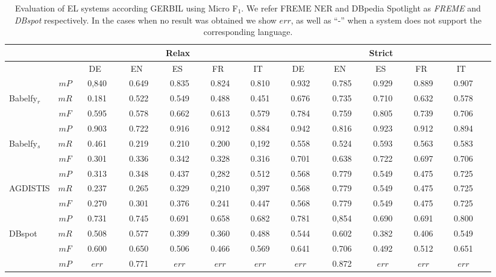 \documentclass{llncs}
\begin{document}
\begin{table}[tb!]
\centering
\caption{Evaluation of EL systems according GERBIL using Micro F$_1$. We refer FREME NER and DBpedia Spotlight as \textit{FREME} and \textit{DBspot} respectively. In the cases when no result was obtained we show $err$, as well as ``-'' when a system does not support the corresponding language.}
\label{tab:gerbil}
\begin{tabular}{@{}lcccccccccccc@{}}
\toprule
            && \multicolumn{5}{c}{Relax}   & \multicolumn{5}{c}{Strict}  \\ \midrule
            &&~~DE~~~&~~EN~~~&~~ES~~~&~~FR~~~&~~IT~~~&~~DE~~~&~~EN~~~&~~ES~~~&~~FR~~~&~~IT~~~\\
            \cmidrule(lr){3-7}\cmidrule(lr){8-12}
            &$mP$& 0,840& 0.649 & 0.835 & 0.824 & 0.810 & 0.932 & 0.785 & 0.929 & 0.889 & 0.907 \\
Babelfy$_r$ &$mR$& 0.181& 0.522 & 0.549 & 0.488 & 0.451 & 0.676 & 0.735 & 0.710 & 0.632 & 0.578 \\
            &$mF$& 0.595& 0.578 & 0.662 & 0.613 & 0.579 & 0.784 & 0.759 & 0.805 & 0.739 & 0.706 \\\midrule
            &$mP$& 0.903& 0.722 & 0.916 & 0.912 & 0.884 & 0.942 & 0.816 & 0.923 & 0.912 & 0.894 \\
Babelfy$_s$ &$mR$& 0.461& 0.219 & 0.210 & 0.200 & 0,192 & 0.558 & 0.524 & 0.593 & 0.563 & 0.583 \\
            &$mF$& 0.301& 0.336 & 0.342 & 0.328 & 0.316 & 0.701 & 0.638 & 0.722 & 0.697 & 0.706 \\\midrule
            &$mP$& 0.313& 0.348 & 0.437 & 0,282 & 0.512 & 0.568 & 0.779 & 0.549 & 0.475 & 0.725 \\
AGDISTIS    &$mR$& 0.237& 0.265 & 0.329 & 0,210 & 0,397 & 0.568 & 0.779 & 0.549 & 0.475 & 0.725 \\
            &$mF$& 0.270& 0.301 & 0.376 & 0.241 & 0.447 & 0.568 & 0.779 & 0.549 & 0.475 & 0.725 \\\midrule
            &$mP$& 0.731& 0.745 & 0.691 & 0.658 & 0.682 & 0.781 & 0,854 & 0.690 & 0.691 & 0.800  \\
DBspot      &$mR$& 0.508& 0.577 & 0.399 & 0.360 & 0.488 & 0.544 & 0.602 & 0.382 & 0.406 & 0.549  \\
            &$mF$& 0.600& 0.650 & 0.506 & 0.466 & 0.569 & 0.641 & 0.706 & 0.492 & 0.512 & 0.651 \\\midrule
            &$mP$& $err$& 0.771 & $err$ & $err$ & $err$ & $err$ & 0.872 & $err$ & $err$ & $err$  \\

\end{tabular}
\end{table}
\end{document}
